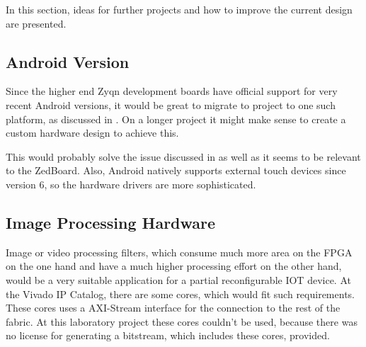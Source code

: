 In this section, ideas for further projects and how to improve the current
design are presented.
\subsection{Android Version}
Since the higher end Zyqn development boards have official support for very
recent Android versions, it would be great to migrate to project to one such
platform, as discussed in .
On a longer project it might make sense to create a custom hardware design to
achieve this.

This would probably solve the issue discussed in  as
well as it seems to be relevant to the ZedBoard.
Also, Android natively supports external touch devices since version 6, so the
hardware drivers are more sophisticated.

\subsection{Image Processing Hardware}
Image or video processing filters, which consume much more area on the FPGA on the one hand and have a much higher processing effort on the other hand, would be a very suitable application for a partial reconfigurable IOT device. At the Vivado IP Catalog, there are some cores, which would fit such requirements. These cores uses a AXI-Stream interface for the connection to the rest of the fabric. At this laboratory project these cores couldn't be used, because there was no license for generating a bitstream, which includes these cores, provided.
